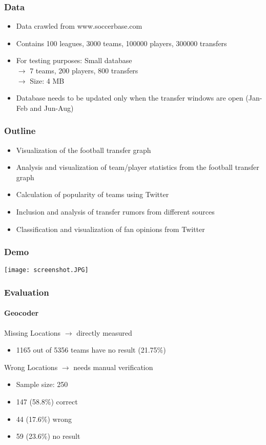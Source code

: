 \documentclass{beamer}
\begin{document}
	\begin{frame}
    \frametitle{Data}
		\begin{itemize}
      \item Data crawled from www.soccerbase.com
			\item Contains 100 leagues, 3000 teams, 100000 players, 300000 transfers
			\item For testing purposes: Small database \\
						$\rightarrow$ 7 teams, 200 players, 800 transfers \\
						$\rightarrow$ Size: 4 MB
			\item Database needs to be updated only when the transfer windows are open (Jan-Feb and Jun-Aug)
		\end{itemize}
  \end{frame}
	
	\begin{frame}
    \frametitle{Outline}
		\begin{itemize}
      \item Visualization of the football transfer graph \checkmark
			\item Analysis and visualization of team/player statistics from the football transfer graph 
			\item Calculation of popularity of teams using Twitter 
			\item Inclusion and analysis of transfer rumors from different sources \checkmark
			\item Classification and visualization of fan opinions from Twitter \checkmark
		\end{itemize}
  \end{frame}
	
	\begin{frame}
    \frametitle{Demo}
		\begin{center}
      \texttt{[image: screenshot.JPG]}\\
			\end{center}
  \end{frame}
	
	\begin{frame}
    \frametitle{Evaluation}
		\framesubtitle{Geocoder}
		\begin{block}{Missing Locations}
			$\rightarrow$ directly measured
			\begin{itemize}
      \item 1165 out of 5356 teams have no result (21.75\%)
			\end{itemize}
		\end{block}
	  \begin{block}{Wrong Locations}
			$\rightarrow$ needs manual verification
			\begin{itemize}
			\item Sample size: 250
      \item 147 (58.8\%) correct
			\item 44 (17.6\%) wrong 
			\item 59 (23.6\%) no result
			\end{itemize}
    \end{block}
  \end{frame}
	
\end{document}
